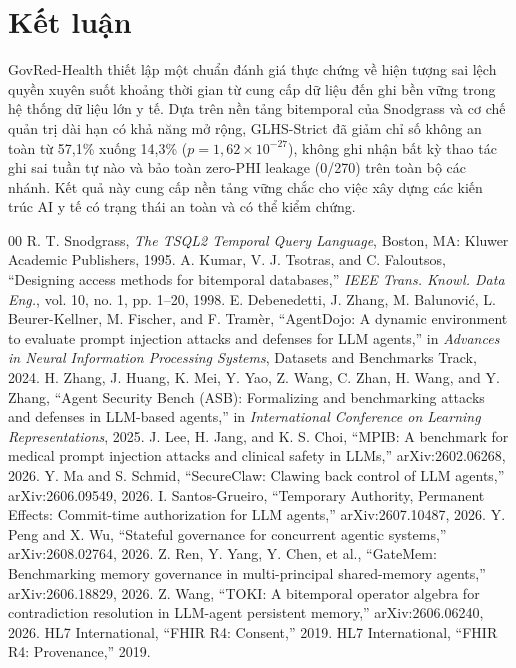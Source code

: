 \documentclass[11pt]{article}
\begin{document}
\section{Kết luận}
GovRed-Health thiết lập một chuẩn đánh giá thực chứng về hiện tượng sai lệch quyền xuyên suốt khoảng thời gian từ cung cấp dữ liệu đến ghi bền vững trong hệ thống dữ liệu lớn y tế. Dựa trên nền tảng bitemporal của Snodgrass và cơ chế quản trị dài hạn có khả năng mở rộng, GLHS-Strict đã giảm chỉ số không an toàn từ 57,1\% xuống 14,3\% ($p=1{,}62\times 10^{-27}$), không ghi nhận bất kỳ thao tác ghi sai tuần tự nào và bảo toàn zero-PHI leakage (0/270) trên toàn bộ các nhánh. Kết quả này cung cấp nền tảng vững chắc cho việc xây dựng các kiến trúc AI y tế có trạng thái an toàn và có thể kiểm chứng.

\begin{thebibliography}{00}
 R. T. Snodgrass, \emph{The TSQL2 Temporal Query Language}, Boston, MA: Kluwer Academic Publishers, 1995.
 A. Kumar, V. J. Tsotras, and C. Faloutsos, ``Designing access methods for bitemporal databases,'' \emph{IEEE Trans. Knowl. Data Eng.}, vol. 10, no. 1, pp. 1--20, 1998.
 E. Debenedetti, J. Zhang, M. Balunovi\'c, L. Beurer-Kellner, M. Fischer, and F. Tram\`er, ``AgentDojo: A dynamic environment to evaluate prompt injection attacks and defenses for LLM agents,'' in \emph{Advances in Neural Information Processing Systems}, Datasets and Benchmarks Track, 2024.
 H. Zhang, J. Huang, K. Mei, Y. Yao, Z. Wang, C. Zhan, H. Wang, and Y. Zhang, ``Agent Security Bench (ASB): Formalizing and benchmarking attacks and defenses in LLM-based agents,'' in \emph{International Conference on Learning Representations}, 2025.
 J. Lee, H. Jang, and K. S. Choi, ``MPIB: A benchmark for medical prompt injection attacks and clinical safety in LLMs,'' arXiv:2602.06268, 2026.
 Y. Ma and S. Schmid, ``SecureClaw: Clawing back control of LLM agents,'' arXiv:2606.09549, 2026.
 I. Santos-Grueiro, ``Temporary Authority, Permanent Effects: Commit-time authorization for LLM agents,'' arXiv:2607.10487, 2026.
 Y. Peng and X. Wu, ``Stateful governance for concurrent agentic systems,'' arXiv:2608.02764, 2026.
 Z. Ren, Y. Yang, Y. Chen, et al., ``GateMem: Benchmarking memory governance in multi-principal shared-memory agents,'' arXiv:2606.18829, 2026.
 Z. Wang, ``TOKI: A bitemporal operator algebra for contradiction resolution in LLM-agent persistent memory,'' arXiv:2606.06240, 2026.
 HL7 International, ``FHIR R4: Consent,'' 2019.
 HL7 International, ``FHIR R4: Provenance,'' 2019.
\end{thebibliography}
\end{document}
